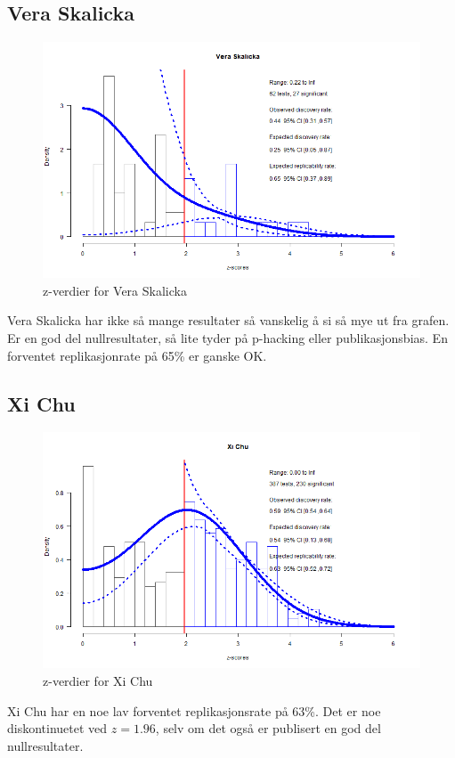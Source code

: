 \documentclass[doc,norsk]{apa7}
\begin{document}
\subsection{Vera Skalicka}
\begin{figure}[h!]
    \centering
    \includegraphics[width=\textwidth]{images/Vera Skalicka.png}
    \caption{z-verdier for Vera Skalicka}
\end{figure}
Vera Skalicka har ikke så mange resultater så vanskelig å si så mye ut fra grafen. Er en god del nullresultater, så lite tyder på p-hacking eller publikasjonsbias. En forventet replikasjonrate på 65\% er ganske OK.

\subsection{Xi Chu}
\begin{figure}[h!]
    \centering
    \includegraphics[width=\textwidth]{images/Xi Chu.png}
    \caption{z-verdier for Xi Chu}
\end{figure}
Xi Chu har en noe lav forventet replikasjonsrate på 63\%. Det er noe diskontinuetet ved $z=1.96$, selv om det også er publisert en god del nullresultater.
\end{document}
